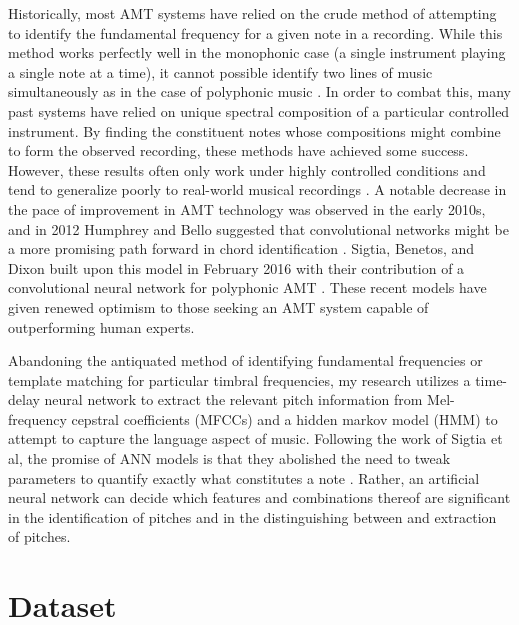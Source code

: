 \documentclass[conference]{IEEEtran}
\begin{document}
Historically, most AMT systems have relied on the crude method of attempting to identify the fundamental frequency for a given note in a recording. While this method works perfectly well in the monophonic case (a single instrument playing a single note at a time), it cannot possible identify two lines of music simultaneously as in the case of polyphonic music \cite{benetos}. In order to combat this, many past systems have relied on unique spectral composition of a particular controlled instrument. By finding the constituent notes whose compositions might combine to form the observed recording, these methods have achieved some success. However, these results often only work under highly controlled conditions and tend to generalize poorly to real-world musical recordings \cite{benetos2}. A notable decrease in the pace of improvement in AMT technology was observed in the early 2010s, and in 2012 Humphrey and Bello suggested that convolutional networks might be a more promising path forward in chord identification \cite{humphrey}. Sigtia, Benetos, and Dixon built upon this model in February 2016 with their contribution of a convolutional neural network for polyphonic AMT \cite{sigtia}. These recent models have given renewed optimism to those seeking an AMT system capable of outperforming human experts.

Abandoning the antiquated method of identifying fundamental frequencies or template matching for particular timbral frequencies, my research utilizes a time-delay neural network to extract the relevant pitch information from Mel-frequency cepstral coefficients (MFCCs) and a hidden markov model (HMM) to attempt to capture the language aspect of music. Following the work of Sigtia et al, the promise of ANN models is that they abolished the need to tweak parameters to quantify exactly what constitutes a note \cite{sigtia}. Rather, an artificial neural network can decide which features and combinations thereof are significant in the identification of pitches and in the distinguishing between and extraction of pitches.

\section{Dataset}
\end{document}
